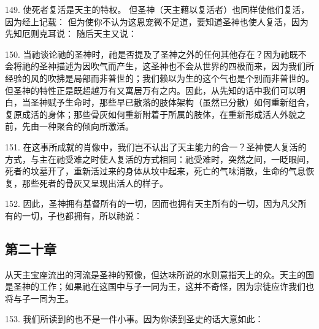 149. 使死者复活是天主的特权。 但圣神（天主藉以复活者）也同样使他们复活，因为经上记载： 但为使你不认为这恩宠微不足道，要知道圣神也使人复活，因为先知厄则克耳说： 随后天主又说：\par

150. 当祂谈论祂的圣神时，祂是否提及了圣神之外的任何其他存在？因为祂既不会将祂的圣神描述为因吹气而产生，这圣神也不会从世界的四极而来，因为我们所经验的风的吹拂是局部而非普世的；我们赖以为生的这个气也是个别而非普世的。但圣神的特性正是既超越万有又寓居万有之内。因此，从先知的话中我们可以明白，当圣神赋予生命时，那些早已散落的肢体架构（虽然已分散）如何重新组合，复原成活的身体；那些骨灰如何重新附着于所属的肢体，在重新形成活人外貌之前，先由一种聚合的倾向所激活。\par

151. 在这事所成就的肖像中，我们岂不认出了天主能力的合一？圣神使人复活的方式，与主在祂受难之时使人复活的方式相同：祂受难时，突然之间，一眨眼间，死者的坟墓开了，重新活过来的身体从坟中起来，死亡的气味消散，生命的气息恢复，那些死者的骨灰又呈现出活人的样子。\par

152. 因此，圣神拥有基督所有的一切，因而也拥有天主所有的一切，因为凡父所有的一切，子也都拥有，所以祂说：\par


\subsection{第二十章}

从天主宝座流出的河流是圣神的预像，但达味所说的水则意指天上的众。天主的国是圣神的工作；如果祂在这国中与子一同为王，这并不奇怪，因为宗徒应许我们也将与子一同为王。\par

153. 我们所读到的也不是一件小事。因为你读到圣史的话大意如此：\par


